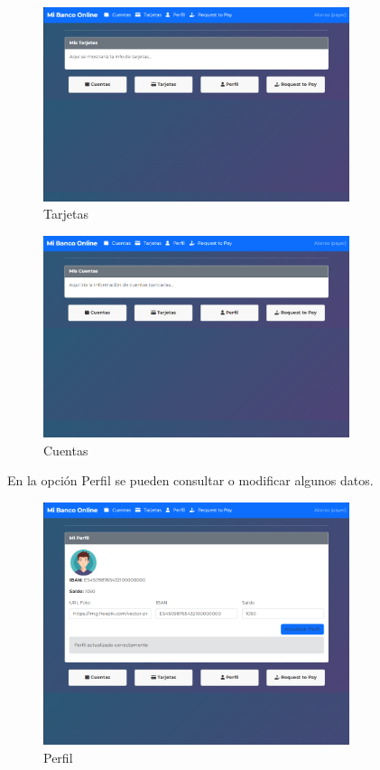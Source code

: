\begin{figure}[H]
  \centering
  \includegraphics[width=0.8\textwidth]{Imagenes/Tarjetas.png}
  \caption{Tarjetas}
  \label{fig:Tarjetas}
\end{figure}

\begin{figure}[H]
  \centering
  \includegraphics[width=0.8\textwidth]{Imagenes/Cuentas.png}
  \caption{Cuentas}
  \label{fig:Cuentas}
\end{figure}

En la opción Perfil se pueden consultar o modificar algunos datos.

\begin{figure}[H]
  \centering
  \includegraphics[width=0.8\textwidth]{Imagenes/Perfil.png}
  \caption{Perfil}
  \label{fig:Perfil}
\end{figure}

